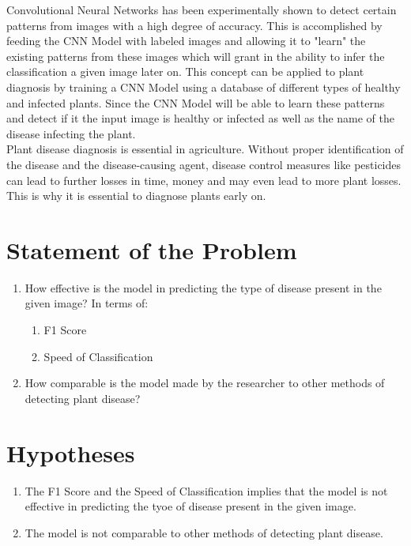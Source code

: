Convolutional Neural Networks has been experimentally shown 
to detect certain patterns from images with a high degree of 
accuracy. This is accomplished 
by feeding the CNN Model with labeled images and allowing it to "learn"
the existing patterns from these images which will grant in the ability 
to infer the classification a given image later on. This concept 
can be applied to plant diagnosis by training a CNN Model using a database 
of different types of healthy and infected plants. Since the CNN Model 
will be able to learn these patterns and detect if it the input image is 
healthy or infected as well as the name of the disease infecting the plant. \\


Plant disease diagnosis is essential in agriculture. Without proper 
identification of the disease and the disease-causing agent, disease 
control measures like pesticides can lead to further losses in time,
money and may even lead to more plant losses. This is why it is essential
to diagnose plants early on. \\ 

\section{Statement of the Problem}

    \begin{enumerate}
    \item How effective is the model in predicting the
    type of disease present in the given image? 
    In terms of:

        \begin{enumerate}
            \item F1 Score 
            \item Speed of Classification 
        \end{enumerate}

    \item How comparable is the model made by the researcher 
    to other methods of detecting plant disease? 
    \end{enumerate}

\section{Hypotheses}
    \begin{enumerate}
        \item The F1 Score and the Speed of Classification implies that
              the model is not effective in predicting the tyoe of disease 
              present in the given image.
        \item The model is not comparable to other methods of detecting plant
              disease.
    \end{enumerate}

